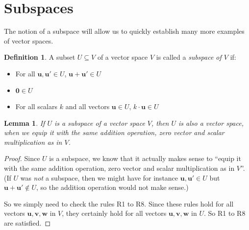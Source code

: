 \documentclass[a4paper,11pt]{book}
\newtheorem{lemma}[theorem]{Lemma}
\theoremstyle{definition}
\newtheorem{definition}[theorem]{Definition}
\newcommand{\ve}[1]{\mathbf{#1}}
\begin{document}
\section{Subspaces} \label{Ch1Sec6Subspaces}
The notion of a subspace will allow us to quickly establish many more examples of vector spaces.
\begin{definition}A subset $U \subseteq V$ of a vector space $V$ is called a {\em subspace of $V$} if:
\begin{itemize} \item For all $\ve{u}, \ve{u}' \in U$, $\ve{u}+\ve{u}' \in U$
\item $\ve{0} \in U$
\item For all scalars $k$ and all vectors $\ve{u} \in U$, $k \cdot \ve{u} \in U$
\end{itemize}
\end{definition}
\begin{lemma} If $U$ is a subspace of a vector space $V$, then $U$ is also a vector space, when we equip it with the same addition operation, zero vector and scalar multiplication as in $V$. \label{subspace_lem}
\end{lemma}
\begin{proof} Since $U$ is a subspace, we know that it actually makes sense to ``equip it with the same addition operation, zero vector and scalar multiplication as in $V$''. (If $U$ was {\em not} a subspace, then we might have for instance $\ve{u}, \ve{u}' \in U$ but $\ve{u}+\ve{u}' \notin U$, so the addition operation would not make sense.)

So we simply need to check the rules R1 to R8. Since these rules hold for all vectors $\ve{u}, \ve{v}, \ve{w}$ in $V$, they certainly hold for all vectors $\ve{u}, \ve{v}, \ve{w}$ in $U$. So R1 to R8 are satisfied.
\end{proof}
\end{document}
